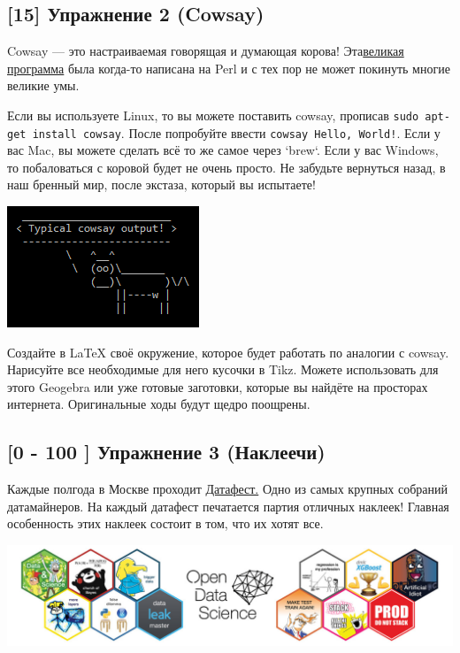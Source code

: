 \documentclass[12pt, a4paper, oneside]{article}
\begin{document}
\subsection*{[15]  Упражнение 2  (Cowsay)}

Cowsay — это настраиваемая говорящая и думающая корова! Эта\href{http://citkit.ru/articles/679/}{великая программа} была когда-то написана на Perl и с тех пор не может покинуть многие великие умы.

Если вы используете Linux, то вы можете поставить cowsay, прописав \texttt{sudo apt-get install cowsay}. После попробуйте ввести \texttt{cowsay Hello, World!}. Если у вас Mac, вы можете сделать всё то же самое через `brew`. Если у вас Windows, то побаловаться с коровой будет не очень просто. Не забудьте вернуться назад, в наш бренный мир, после экстаза, который вы испытаете!

\begin{center}
\includegraphics[scale=1]{Cowsay_Typical_Output.png}
\end{center}

Создайте в LaTeX своё окружение, которое будет работать по аналогии с cowsay. Нарисуйте все необходимые для него кусочки в Tikz. Можете использовать для этого Geogebra или уже готовые заготовки, которые вы найдёте на просторах интернета. Оригинальные ходы будут щедро поощрены.

\subsection*{[0 - 100 ]  Упражнение 3  (Наклеечи)}

Каждые полгода в Москве проходит \href{http://datafest.ru/}{Датафест.} Одно из самых крупных собраний датамайнеров. На каждый датафест печатается партия отличных наклеек! Главная особенность этих наклеек состоит в том, что их хотят все.

\begin{center}
	\includegraphics[scale=0.35]{DF.jpg}
\end{center}
\end{document}
